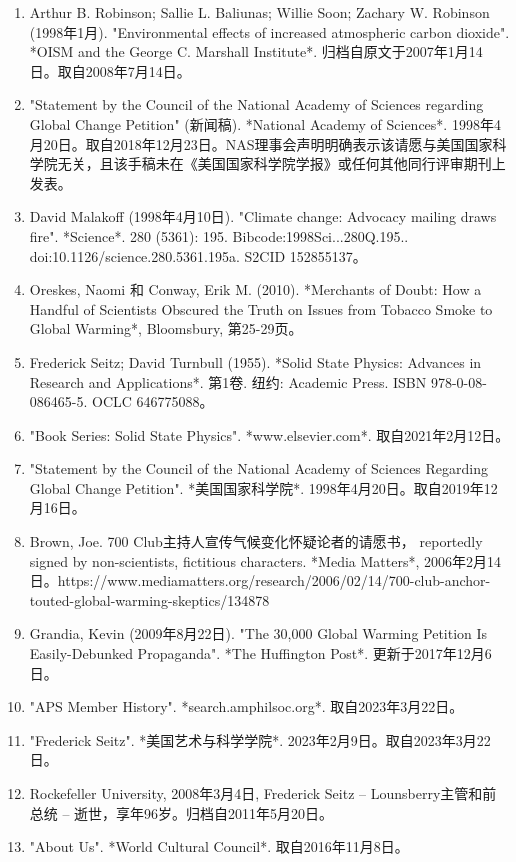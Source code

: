 \begin{enumerate}
\item Arthur B. Robinson; Sallie L. Baliunas; Willie Soon; Zachary W. Robinson (1998年1月). "Environmental effects of increased atmospheric carbon dioxide". *OISM and the George C. Marshall Institute*. 归档自原文于2007年1月14日。取自2008年7月14日。
\item "Statement by the Council of the National Academy of Sciences regarding Global Change Petition" (新闻稿). *National Academy of Sciences*. 1998年4月20日。取自2018年12月23日。NAS理事会声明明确表示该请愿与美国国家科学院无关，且该手稿未在《美国国家科学院学报》或任何其他同行评审期刊上发表。
\item David Malakoff (1998年4月10日). "Climate change: Advocacy mailing draws fire". *Science*. 280 (5361): 195. Bibcode:1998Sci...280Q.195.. doi:10.1126/science.280.5361.195a. S2CID 152855137。
\item Oreskes, Naomi 和 Conway, Erik M. (2010). *Merchants of Doubt: How a Handful of Scientists Obscured the Truth on Issues from Tobacco Smoke to Global Warming*, Bloomsbury, 第25-29页。
\item Frederick Seitz; David Turnbull (1955). *Solid State Physics: Advances in Research and Applications*. 第1卷. 纽约: Academic Press. ISBN 978-0-08-086465-5. OCLC 646775088。
\item "Book Series: Solid State Physics". *www.elsevier.com*. 取自2021年2月12日。
\item "Statement by the Council of the National Academy of Sciences Regarding Global Change Petition". *美国国家科学院*. 1998年4月20日。取自2019年12月16日。
\item Brown, Joe. 700 Club主持人宣传气候变化怀疑论者的请愿书， reportedly signed by non-scientists, fictitious characters. *Media Matters*, 2006年2月14日。https://www.mediamatters.org/research/2006/02/14/700-club-anchor-touted-global-warming-skeptics/134878
\item Grandia, Kevin (2009年8月22日). "The 30,000 Global Warming Petition Is Easily-Debunked Propaganda". *The Huffington Post*. 更新于2017年12月6日。
\item "APS Member History". *search.amphilsoc.org*. 取自2023年3月22日。
\item "Frederick Seitz". *美国艺术与科学学院*. 2023年2月9日。取自2023年3月22日。
\item Rockefeller University, 2008年3月4日, Frederick Seitz – Lounsberry主管和前总统 – 逝世，享年96岁。归档自2011年5月20日。
\item "About Us". *World Cultural Council*. 取自2016年11月8日。

\end{enumerate}

